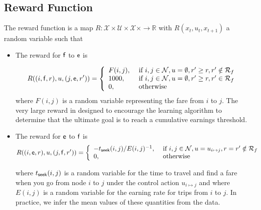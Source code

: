 \documentclass{article}
\newcommand{\mc}{\mathcal}
\newcommand{\mb}{\mathbb}
\newcommand{\rar}{\rightarrow}
\newcommand{\sn}[1]{{\sf{#1}}}
\newcommand{\e}{{\sf e}}
\newcommand{\f}{{\sf f}}
\begin{document}
\subsection{Reward Function}
The reward function is a map $R:\mc{X}\times \mc{U}\times \mc{X}\times \rar \mb{R}$ with $R(x_{t},u_t,x_{t+1})$ a random variable such that
\begin{itemize}
\item The reward for $\f$ to $\e$ is 

\[R( (i,\f,r), u, (j,\e,r'))=\left\{\begin{array}{ll}F(i,j), & \ \text{if}\ i,j\in \mc{N}, u=\emptyset, r'\geq r, r' \notin \mc{R}_f\\ 
1000, & \ \text{if}\ i,j\in \mc{N}, u=\emptyset, r'\geq r, r' \in \mc{R}_f\\ 
0, & \ \text{otherwise}\end{array}\right.\]
where $F(i,j)$ is a random variable representing the fare from $i$ to $j$. The very large reward in designed to encourage the learning algorithm to determine that the ultimate goal is to reach a cumulative earnings threshold. 


\item The reward for $\e$ to $\f$ is 
\[R((i,\e,r), u, (j,\f,r'))=\left\{\begin{array}{ll}-t_{\text{\sn{seek}}}(i,j)/E(i,j)^{-1}, & \ \text{if}\ i,j\in \mc{N}, u=u_{i\mapsto j}, r=r'\notin \mc{R}_f\\
0, & \ \text{otherwise}\end{array}\right.\]

where $t_{\text{\sn{seek}}}(i,j)$ is a random variable for the time to travel and find a fare when you go from node $i$ to $j$ under the control action $u_{i\mapsto j}$ and where $E(i,j)$ is a random variable for the earning rate for trips from $i$ to $j$. In practice, we infer the mean values of these quantities from the data.
\end{itemize}
\end{document}

